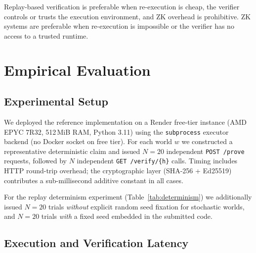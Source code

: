 \documentclass[11pt]{article}
\begin{document}
Replay-based verification is preferable when re-execution is cheap, the
verifier controls or trusts the execution environment, and ZK overhead is
prohibitive.  ZK systems are preferable when re-execution is impossible or
the verifier has no access to a trusted runtime.

\section{Empirical Evaluation}
\label{sec:eval}

\subsection{Experimental Setup}

We deployed the reference implementation on a Render free-tier instance
(AMD EPYC 7R32, 512\,MiB RAM, Python 3.11) using the \texttt{subprocess}
executor backend (no Docker socket on free tier).  For each world $w$ we
constructed a representative deterministic claim and issued $N = 20$
independent \texttt{POST /prove} requests, followed by $N$ independent
\texttt{GET /verify/\{h\}} calls.  Timing includes HTTP round-trip overhead;
the cryptographic layer (SHA-256 + Ed25519) contributes a sub-millisecond
additive constant in all cases.

For the replay determinism experiment (Table~\ref{tab:determinism}) we
additionally issued $N = 20$ trials \emph{without} explicit random seed
fixation for stochastic worlds, and $N = 20$ trials \emph{with} a fixed
seed embedded in the submitted code.

\subsection{Execution and Verification Latency}
\end{document}
